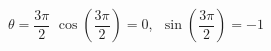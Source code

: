 {$\theta = \dfrac{3\pi}{2}$}
{ $\cos \left(\dfrac{3\pi}{2}\right) = 0$, $\; \sin \left(\dfrac{3\pi}{2}\right) = -1$}
